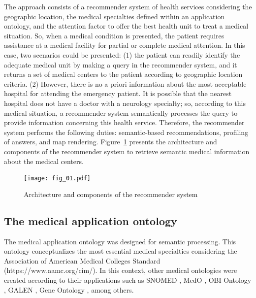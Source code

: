 \documentclass[sustainability,article,submit,pdftex,moreauthors]{Definitions/mdpi}
\begin{document}
The approach consists of a recommender system of health services considering the geographic location, the medical specialties defined within an application ontology, and the attention factor to offer the best health unit to treat a medical situation. So, when a medical condition is presented, the patient requires assistance at a medical facility for partial or complete medical attention. In this case, two scenarios could be presented: (1) the patient can readily identify the adequate medical unit by making a query in the recommender system, and it returns a set of medical centers to the patient according to geographic location criteria. (2) However, there is no a priori information about the most acceptable hospital for attending the emergency patient. It is possible that the nearest hospital does not have a doctor with a neurology specialty; so, according to this medical situation, a recommender system semantically processes the query to provide information concerning this health service. Therefore, the recommender system performs the following duties: semantic-based recommendations, profiling of answers, and map rendering. Figure~\ref{fig:arquitectura} presents the architecture and components of the recommender system to retrieve semantic medical information about the medical centers.

\begin{figure}
	\begin{center}
		\texttt{[image: fig\_01.pdf]}
	\end{center}
	\caption{Architecture and components of the recommender system\label{fig:arquitectura}}
\end{figure}

\subsection{The medical application ontology}

The medical application ontology was designed for semantic processing. This ontology conceptualizes the most essential medical specialties considering the Association of American Medical Colleges Standard (https://www.aamc.org/cim/). In this context, other medical ontologies were created according to their applications such as SNOMED \citep{cornet2008forty}, MedO \citep{fujita2010multiviews}, OBI Ontology \citep{bandrowski2016ontology}, GALEN \citep{rector2006ontological}, Gene Ontology \citep{gene2019gene}, among others.
\end{document}
